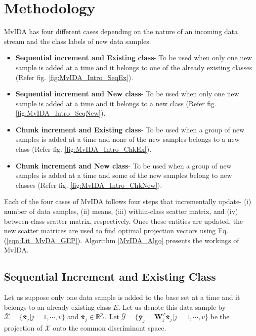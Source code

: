 \section{Methodology}
\label{sec:MvIDA_Algo}
MvIDA has four different cases depending on the nature of an incoming data stream and the class labels of new data samples.
\begin{itemize}
	\item \textbf{Sequential increment and Existing class}- To be used when only one new sample is added at a time and it belongs to one of the already existing classes (Refer fig. \ref{fig:MvIDA_Intro_SeqEx}).
	\item \textbf{Sequential increment and New class}- To be used when only one new sample is added at a time and it belongs to a new class (Refer fig. \ref{fig:MvIDA_Intro_SeqNew}).

	\clearpage

	\item \textbf{Chunk increment and Existing class}- To be used when a group of new samples is added at a time and none of the new samples belongs to a new class (Refer fig. \ref{fig:MvIDA_Intro_ChkEx}).
	\item \textbf{Chunk increment and New class}- To be used when a group of new samples is added at a time and some of the new samples belong to new classes (Refer fig. \ref{fig:MvIDA_Intro_ChkNew}).
\end{itemize}

Each of the four cases of MvIDA follows four steps that incrementally update- (i) number of data samples, (ii) means, (iii) within-class scatter matrix, and (iv) between-class scatter matrix, respectively. Once these entities are updated, the new scatter matrices are used to find optimal projection vectors using Eq.(\ref{eqn:Lit_MvDA_GEP}). Algorithm \ref{MvIDA_Algo} presents the workings of MvIDA.





\subsection{Sequential Increment and Existing Class}
\label{subs:MvIDA_SeqEC}
Let us suppose only one data sample is added to the base set at a time and it belongs to an already existing class $E$. Let us denote this data sample by 
$\bar{\mathcal{X}} = \{ \bar{\textbf{x}}_{j} | j=1,\cdots,v \} $ and $\bar{\textbf{x}}_j \in \mathbb{R}^{p_j}$. Let $\bar{\mathcal{Y}} = \{ \bar{\textbf{y}}_{j} = \textbf{W}_j^T \bar{\textbf{x}}_{j} | j=1,\cdots,v \} $ be the projection of $\bar{\mathcal{X}}$ onto the common discriminant space.

